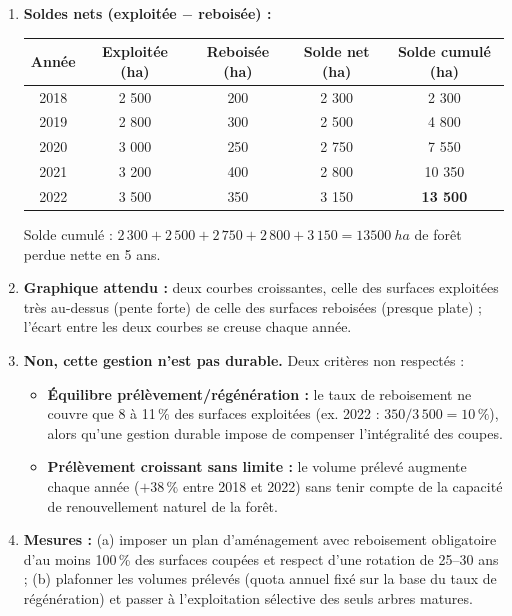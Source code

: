 \documentclass[11pt]{article}
\newcommand{\cle}[1]{{\popxbold\color{popdark}#1}}
\begin{document}
\begin{corrige}
\begin{enumerate}
\item \textbf{Soldes nets (exploitée $-$ reboisée) :}
\begin{center}
\begin{tabular}{|c|c|c|c|c|}\hline
\rowcolor{popblueL} \textbf{Année} & \textbf{Exploitée (ha)} & \textbf{Reboisée (ha)} & \textbf{Solde net (ha)} & \textbf{Solde cumulé (ha)} \\ \hline
2018 & 2 500 & 200 & 2 300 & 2 300 \\ \hline
2019 & 2 800 & 300 & 2 500 & 4 800 \\ \hline
2020 & 3 000 & 250 & 2 750 & 7 550 \\ \hline
2021 & 3 200 & 400 & 2 800 & 10 350 \\ \hline
2022 & 3 500 & 350 & 3 150 & \textbf{13 500} \\ \hline
\end{tabular}
\end{center}
Solde cumulé : $2\,300+2\,500+2\,750+2\,800+3\,150 = \SI{13 500}{ha}$ de forêt perdue nette en 5 ans.
\item \textbf{Graphique attendu :} deux courbes croissantes, celle des surfaces exploitées très au-dessus (pente forte) de celle des surfaces reboisées (presque plate) ; l'écart entre les deux courbes se creuse chaque année.
\item \textbf{Non, cette gestion n'est pas durable.} Deux critères non respectés :
\begin{itemize}
\item \textbf{Équilibre prélèvement/régénération :} le taux de reboisement ne couvre que 8 à 11\,\% des surfaces exploitées (ex. 2022 : $350/3\,500 = 10\,\%$), alors qu'une gestion durable impose de compenser l'intégralité des coupes.
\item \textbf{Prélèvement croissant sans limite :} le volume prélevé augmente chaque année ($+38\,\%$ entre 2018 et 2022) sans tenir compte de la capacité de renouvellement naturel de la forêt.
\end{itemize}
\item \textbf{Mesures :} (a) imposer un \cle{plan d'aménagement} avec reboisement obligatoire d'au moins 100\,\% des surfaces coupées et respect d'une rotation de 25--30 ans ; (b) plafonner les volumes prélevés (quota annuel fixé sur la base du taux de régénération) et passer à l'exploitation sélective des seuls arbres matures.
\end{enumerate}
\end{corrige}
\end{document}
